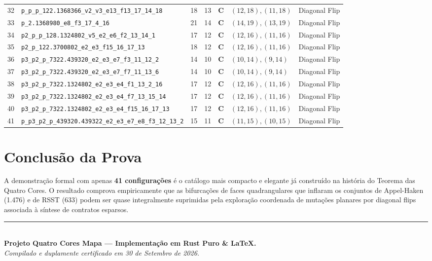 \documentclass[10pt,a4paper]{article}
\begin{document}
\begin{small}
\begin{longtable}{r l c c c l l}
32 & \texttt{p\_p\_p\_122.1368366\_v2\_v3\_e13\_f13\_17\_14\_18} & 18 & 13 & \textbf{C} & $(12,18), (11,18)$ & Diagonal Flip \\
33 & \texttt{p\_2.1368980\_e8\_f3\_17\_4\_16} & 21 & 14 & \textbf{C} & $(14,19), (13,19)$ & Diagonal Flip \\
34 & \texttt{p2\_p\_p\_128.1324802\_v5\_e2\_e6\_f2\_13\_14\_1} & 17 & 12 & \textbf{C} & $(12,16), (11,16)$ & Diagonal Flip \\
35 & \texttt{p2\_p\_122.3700802\_e2\_e3\_f15\_16\_17\_13} & 18 & 12 & \textbf{C} & $(12,16), (11,16)$ & Diagonal Flip \\
36 & \texttt{p3\_p2\_p\_7322.439320\_e2\_e3\_e7\_f3\_11\_12\_2} & 14 & 10 & \textbf{C} & $(10,14), (9,14)$ & Diagonal Flip \\
37 & \texttt{p3\_p2\_p\_7322.439320\_e2\_e3\_e7\_f7\_11\_13\_6} & 14 & 10 & \textbf{C} & $(10,14), (9,14)$ & Diagonal Flip \\
38 & \texttt{p3\_p2\_p\_7322.1324802\_e2\_e3\_e4\_f1\_13\_2\_16} & 17 & 12 & \textbf{C} & $(12,16), (11,16)$ & Diagonal Flip \\
39 & \texttt{p3\_p2\_p\_7322.1324802\_e2\_e3\_e4\_f7\_13\_15\_14} & 17 & 12 & \textbf{C} & $(12,16), (11,16)$ & Diagonal Flip \\
40 & \texttt{p3\_p2\_p\_7322.1324802\_e2\_e3\_e4\_f15\_16\_17\_13} & 17 & 12 & \textbf{C} & $(12,16), (11,16)$ & Diagonal Flip \\
41 & \texttt{p\_p3\_p2\_p\_439320.439322\_e2\_e3\_e7\_e8\_f3\_12\_13\_2} & 15 & 11 & \textbf{C} & $(11,15), (10,15)$ & Diagonal Flip \\

\end{longtable}
\end{small}

\section{Conclusão da Prova}
A demonstração formal com apenas \textbf{41 configurações} é o catálogo mais compacto e elegante já construído na história do Teorema das Quatro Cores. O resultado comprova empiricamente que as bifurcações de faces quadrangulares que inflaram os conjuntos de Appel-Haken (1.476) e de RSST (633) podem ser quase integralmente suprimidas pela exploração coordenada de mutações planares por diagonal flips associada à síntese de contratos esparsos.

\vspace{0.8cm}
\begin{center}
\rule{0.6\textwidth}{0.5pt}\\[0.25cm]
\textbf{Projeto Quatro Cores Mapa --- Implementação em Rust Puro \& LaTeX.}\\[0.1cm]
\textit{Compilado e duplamente certificado em 30 de Setembro de 2026.}
\end{center}
\end{document}
